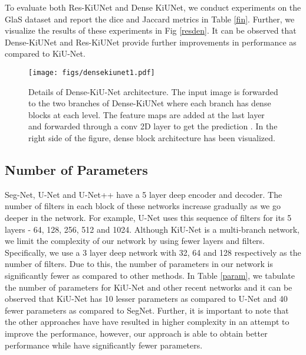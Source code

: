 \documentclass[journal,twoside,web]{ieeecolor}
\begin{document}
To evaluate both Res-KiUNet and Dense KiUNet, we conduct experiments on the GlaS dataset and report the dice and Jaccard metrics in Table \ref{fin}. Further, we   visualize the results of these experiments in Fig \ref{resden}. It can be observed that Dense-KiUNet and Res-KiUNet provide further improvements in performance as compared to KiU-Net.
\begin{figure*}[htb]
	\centering
	\texttt{[image: figs/densekiunet1.pdf]}\\
	
	
	\caption{Details of Dense-KiU-Net architecture. The input image is forwarded to the two branches of Dense-KiUNet where each branch has dense blocks at each level. The feature maps are added at the last layer and forwarded through a  conv 2D layer to get the prediction . In the right side of the figure, dense block architecture has been visualized.  }
	\label{densekiu}
	
\end{figure*}
\subsection{Number of Parameters}

Seg-Net, U-Net and U-Net++ have a 5 layer deep encoder and decoder. The number of filters in each block of these networks increase gradually as we go deeper in the network. For example, U-Net uses this sequence of filters for its 5 layers - 64, 128, 256, 512 and 1024. Although KiU-Net is a multi-branch network, we limit the complexity of our network by using  fewer     layers and  filters. Specifically,  we use a 3 layer deep network with 32, 64 and 128  respectively as the number of filters. Due to this, the number of parameters in our network is significantly  fewer   as compared to other methods. In Table \ref{param}, we tabulate the number of parameters for KiU-Net and other recent networks and it can be observed   that  KiU-Net has 10 lesser parameters as compared to U-Net and 40 fewer parameters as compared to SegNet. Further, it is important to note that the other approaches have have resulted in   higher complexity in an attempt to improve the performance,  however, our approach is able to obtain better performance while have significantly fewer parameters.
\begin{table}[htbp]
	\caption{Comparison of number of parameters}
\end{table}
\end{document}
